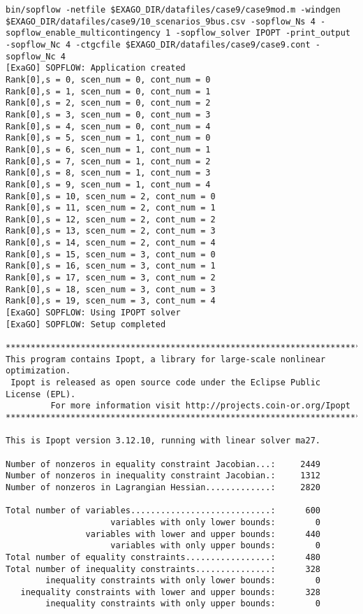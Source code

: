 \begin{lstlisting}
bin/sopflow -netfile $EXAGO_DIR/datafiles/case9/case9mod.m -windgen $EXAGO_DIR/datafiles/case9/10_scenarios_9bus.csv -sopflow_Ns 4 -sopflow_enable_multicontingency 1 -sopflow_solver IPOPT -print_output -sopflow_Nc 4 -ctgcfile $EXAGO_DIR/datafiles/case9/case9.cont -sopflow_Nc 4
[ExaGO] SOPFLOW: Application created
Rank[0],s = 0, scen_num = 0, cont_num = 0
Rank[0],s = 1, scen_num = 0, cont_num = 1
Rank[0],s = 2, scen_num = 0, cont_num = 2
Rank[0],s = 3, scen_num = 0, cont_num = 3
Rank[0],s = 4, scen_num = 0, cont_num = 4
Rank[0],s = 5, scen_num = 1, cont_num = 0
Rank[0],s = 6, scen_num = 1, cont_num = 1
Rank[0],s = 7, scen_num = 1, cont_num = 2
Rank[0],s = 8, scen_num = 1, cont_num = 3
Rank[0],s = 9, scen_num = 1, cont_num = 4
Rank[0],s = 10, scen_num = 2, cont_num = 0
Rank[0],s = 11, scen_num = 2, cont_num = 1
Rank[0],s = 12, scen_num = 2, cont_num = 2
Rank[0],s = 13, scen_num = 2, cont_num = 3
Rank[0],s = 14, scen_num = 2, cont_num = 4
Rank[0],s = 15, scen_num = 3, cont_num = 0
Rank[0],s = 16, scen_num = 3, cont_num = 1
Rank[0],s = 17, scen_num = 3, cont_num = 2
Rank[0],s = 18, scen_num = 3, cont_num = 3
Rank[0],s = 19, scen_num = 3, cont_num = 4
[ExaGO] SOPFLOW: Using IPOPT solver
[ExaGO] SOPFLOW: Setup completed

******************************************************************************
This program contains Ipopt, a library for large-scale nonlinear optimization.
 Ipopt is released as open source code under the Eclipse Public License (EPL).
         For more information visit http://projects.coin-or.org/Ipopt
******************************************************************************

This is Ipopt version 3.12.10, running with linear solver ma27.

Number of nonzeros in equality constraint Jacobian...:     2449
Number of nonzeros in inequality constraint Jacobian.:     1312
Number of nonzeros in Lagrangian Hessian.............:     2820

Total number of variables............................:      600
                     variables with only lower bounds:        0
                variables with lower and upper bounds:      440
                     variables with only upper bounds:        0
Total number of equality constraints.................:      480
Total number of inequality constraints...............:      328
        inequality constraints with only lower bounds:        0
   inequality constraints with lower and upper bounds:      328
        inequality constraints with only upper bounds:        0


\end{lstlisting}
